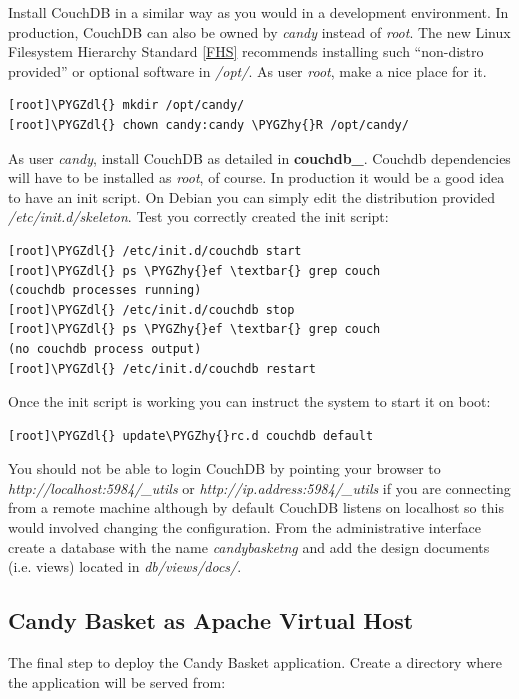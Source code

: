 \documentclass[letterpaper,10pt,english]{sphinxmanual}
\def\PYGZdl{\char`\$}
\def\PYGZhy{\char`\-}
\begin{document}
Install CouchDB in a similar way as you would in a development
environment. In production, CouchDB can also be owned by \emph{candy}
instead of \emph{root}. The new Linux Filesystem Hierarchy Standard {\hyperref[developer-guide:fhs]{{[}FHS{]}}}
recommends installing such ``non-distro provided'' or optional software
in \emph{/opt/}. As user \emph{root}, make a nice place for it.

\begin{Verbatim}[commandchars=\\\{\}]
[root]\PYGZdl{} mkdir /opt/candy/
[root]\PYGZdl{} chown candy:candy \PYGZhy{}R /opt/candy/
\end{Verbatim}

As user \emph{candy}, install CouchDB as detailed in
{\color{red}\bfseries{}couchdb\_}. Couchdb dependencies will have to be installed as
\emph{root}, of course. In production it would be a good idea to have an
init script. On Debian you can simply edit the distribution provided
\emph{/etc/init.d/skeleton}. Test you correctly created the init script:

\begin{Verbatim}[commandchars=\\\{\}]
[root]\PYGZdl{} /etc/init.d/couchdb start
[root]\PYGZdl{} ps \PYGZhy{}ef \textbar{} grep couch
(couchdb processes running)
[root]\PYGZdl{} /etc/init.d/couchdb stop
[root]\PYGZdl{} ps \PYGZhy{}ef \textbar{} grep couch
(no couchdb process output)
[root]\PYGZdl{} /etc/init.d/couchdb restart
\end{Verbatim}

Once the init script is working you can instruct the system to start
it on boot:

\begin{Verbatim}[commandchars=\\\{\}]
[root]\PYGZdl{} update\PYGZhy{}rc.d couchdb default
\end{Verbatim}

You should not be able to login CouchDB by pointing your browser to
\emph{http://localhost:5984/\_utils} or \emph{http://ip.address:5984/\_utils} if
you are connecting from a remote machine although by default CouchDB
listens on localhost so this would involved changing the
configuration.  From the administrative interface create a database
with the name \emph{candybasketng} and add the design documents
(i.e. views) located in \emph{db/views/docs/}.


\subsection{Candy Basket as Apache Virtual Host}
\label{administrator-guide:candy-basket-as-apache-virtual-host}
The final step to deploy the Candy Basket application. Create a
directory where the application will be served from:
\end{document}
